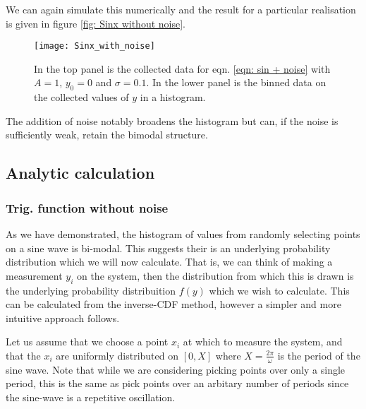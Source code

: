 \documentclass[/home/greg/Thesis/main/main.tex]{subfiles}
\begin{document}
We can again simulate this numerically and the result for a particular
realisation is given in figure \ref{fig: Sinx without noise}.
\begin{figure}[htb]
    \centering
    \texttt{[image: Sinx\_with\_noise]}
    \caption{In the top panel is the collected data for eqn. \eqref{eqn: sin + noise} with
             $A=1$, $y_{0}=0$ and $\sigma =0.1$. In the lower panel is the binned data on the 
         collected values of $y$ in a histogram.}
    \label{fig: Sinx with noise}
\end{figure}

The addition of noise notably broadens the histogram but can, if the noise is
sufficiently weak, retain the bimodal structure. 

\FloatBarrier
\subsection{Analytic calculation}
\label{sec: Analytic calculation sinx}
\subsubsection{Trig. function without noise}

As we have demonstrated, the histogram of values from randomly selecting points
on a sine wave is bi-modal. This suggests their is an underlying probability
distribution which we will now calculate.  That is, we can think of making a
measurement $y_{i}$ on the system, then the distribution from which this is
drawn is the underlying probability distribuition $f(y)$ which we wish to
calculate.  This can be calculated from the inverse-CDF method, however a
simpler and more intuitive approach follows.

Let us assume that we choose a point $x_{i}$ at which to measure the system, and
that the $x_{i}$ are uniformly distributed on $[0, X]$ where $X=\frac{2\pi}{\omega}$
is the period of the sine wave. Note that while we are considering picking points
over only a single period, this is the same as pick points over an arbitary 
number of periods since the sine-wave is a repetitive oscillation.
\end{document}
